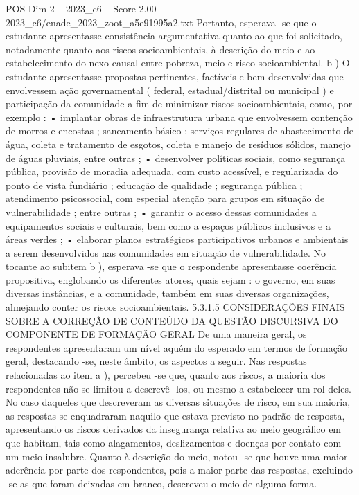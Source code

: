 \begin{textsample}{POS Dim 2 – 2023\_c6 – Score 2.00 – 2023\_c6/enade\_2023\_zoot\_a5e91995a2.txt}
Portanto, esperava -se que o estudante apresentasse consistência argumentativa quanto ao que foi solicitado, notadamente quanto aos riscos socioambientais, à descrição do meio e ao estabelecimento do nexo causal entre pobreza, meio e risco socioambiental. b ) O estudante apresentasse propostas pertinentes, factíveis e bem desenvolvidas que envolvessem ação governamental ( federal, estadual/distrital ou municipal ) e participação da comunidade a fim de minimizar riscos socioambientais, como, por exemplo : • implantar obras de infraestrutura urbana que envolvessem contenção de morros e encostas ; saneamento básico : serviços regulares de abastecimento de água, coleta e tratamento de esgotos, coleta e manejo de resíduos sólidos, manejo de águas pluviais, entre outras ; • desenvolver políticas sociais, como segurança pública, provisão de moradia adequada, com custo acessível, e regularizada do ponto de vista fundiário ; educação de qualidade ; segurança pública ; atendimento psicossocial, com especial atenção para grupos em situação de vulnerabilidade ; entre outras ; • garantir o acesso dessas comunidades a equipamentos sociais e culturais, bem como a espaços públicos inclusivos e a áreas verdes ; • elaborar planos estratégicos participativos urbanos e ambientais a serem desenvolvidos nas comunidades em situação de vulnerabilidade.
No tocante ao subitem b ), esperava -se que o respondente apresentasse coerência propositiva, englobando os diferentes atores, quais sejam : o governo, em suas diversas instâncias, e a comunidade, também em suas diversas organizações, almejando conter os riscos socioambientais. 5.3.1.5 CONSIDERAÇÕES FINAIS SOBRE A CORREÇÃO DE CONTEÚDO DA QUESTÃO DISCURSIVA DO COMPONENTE DE FORMAÇÃO GERAL De uma maneira geral, os respondentes apresentaram um nível aquém do esperado em termos de formação geral, destacando -se, neste âmbito, os aspectos a seguir.
Nas respostas relacionadas ao item a ), percebeu -se que, quanto aos riscos, a maioria dos respondentes não se limitou a descrevê -los, ou mesmo a estabelecer um rol deles.
No caso daqueles que descreveram as diversas situações de risco, em sua maioria, as respostas se enquadraram naquilo que estava previsto no padrão de resposta, apresentando os riscos derivados da insegurança relativa ao meio geográfico em que habitam, tais como alagamentos, deslizamentos e doenças por contato com um meio insalubre.
Quanto à descrição do meio, notou -se que houve uma maior aderência por parte dos respondentes, pois a maior parte das respostas, excluindo -se as que foram deixadas em branco, descreveu o meio de alguma forma.

\end{textsample}

